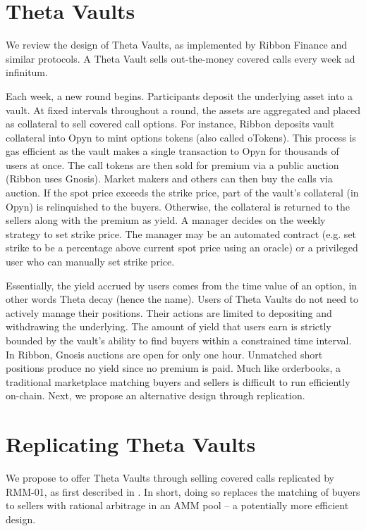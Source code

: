 \documentclass[hidelinks, 12pt]{article}
\begin{document}
\section{Theta Vaults}
\label{sec:theta}

We review the design of Theta Vaults, as implemented by Ribbon Finance and similar protocols. A Theta Vault sells out-the-money covered calls every week ad infinitum.

Each week, a new round begins. Participants deposit the underlying asset into a vault. At fixed intervals throughout a round, the assets are aggregated and placed as collateral to sell covered call options. For instance, Ribbon deposits vault collateral into Opyn to mint options tokens (also called oTokens). This process is gas efficient as the vault makes a single transaction to Opyn for thousands of users at once. The call tokens are then sold for premium via a public auction (Ribbon uses Gnosis). Market makers and others can then buy the calls via auction. If the spot price exceeds the strike price, part of the vault's collateral (in Opyn) is relinquished to the buyers. Otherwise, the collateral is returned to the sellers along with the premium as yield.
A manager decides on the weekly strategy to set strike price. The manager may be an automated contract (e.g. set strike to be a percentage above current spot price using an oracle) or a privileged user who can manually set strike price.

Essentially, the yield accrued by users comes from the time value of an option, in other words Theta decay (hence the name). Users of Theta Vaults do not need to actively manage their positions. Their actions are limited to depositing and withdrawing the underlying. The amount of yield that users earn is strictly bounded by the vault's ability to find buyers within a constrained time interval. In Ribbon, Gnosis auctions are open for only one hour. Unmatched short positions produce no yield since no premium is paid. Much like orderbooks, a traditional marketplace matching buyers and sellers is difficult to run efficiently on-chain. Next, we propose an alternative design through replication.

\section{Replicating Theta Vaults}

We propose to offer Theta Vaults through selling covered calls replicated by RMM-01, as first described in \cite{sterrett2022replicating}. In short, doing so replaces the matching of buyers to sellers with rational arbitrage in an AMM pool -- a potentially more efficient design.
\end{document}
